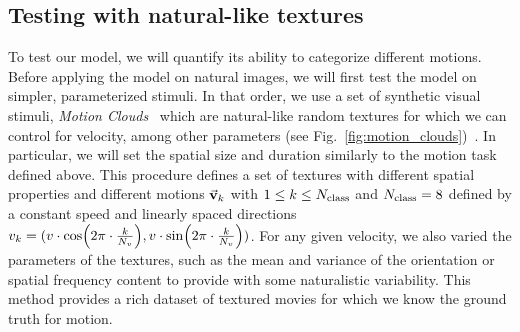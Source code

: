 \documentclass[default]{sn-jnl}%
\theoremstyle{thmstyleone}%
\theoremstyle{thmstyletwo}%
\theoremstyle{thmstylethree}%
\newcommand{\seeFig}[1]{see Fig.~\ref{fig:#1}}%
\newcommand{\note}[1]{{\sethlcolor{yellow}\hl{#1}}}
\begin{document}
%

%
\subsection{Testing with natural-like textures}
To test our model, we will quantify its ability to categorize different motions. Before applying the model on natural images, we will first test the model on simpler, parameterized stimuli. In that order, we use a set of synthetic visual stimuli, \textit{Motion Clouds}~\citep{leon_motion_2012} which are natural-like random textures for which we can control for velocity, among other parameters (\seeFig{motion_clouds})~\citep{vacher_bayesian_2018}. In particular, we will set the spatial size and duration similarly to the motion task defined above.
This procedure defines a set of textures with different spatial properties and different motions $\va{v}_k$ with  $1 \le k \le N_\text{class}$ and $N_\text{class}=8$ defined by a constant speed and linearly spaced directions $
v_k = 
  ( 
    v \cdot \cos(2\pi\cdot \frac{k}{N_v}),
    v \cdot \sin(2\pi\cdot \frac{k}{N_v})
  )
$.
For any given velocity, we also varied the parameters of the textures, such as the mean and variance of the orientation or spatial frequency content to provide with some naturalistic variability. This method provides a rich dataset of textured movies for which we know the ground truth for motion.
\end{document}
